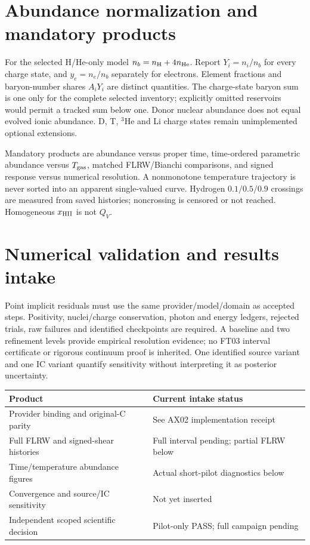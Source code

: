 \documentclass[11pt]{article}
\begin{document}
\section{Abundance normalization and mandatory products}
For the selected H/He-only model $n_b=n_{\rm H}+4n_{\rm He}$. Report $Y_i=n_i/n_b$ for every charge state, and $y_e=n_e/n_b$ separately for electrons. Element fractions and baryon-number shares $A_iY_i$ are distinct quantities. The charge-state baryon sum is one only for the complete selected inventory; explicitly omitted reservoirs would permit a tracked sum below one. Donor nuclear abundance does not equal evolved ionic abundance. D, T, $^3$He and Li charge states remain unimplemented optional extensions.

Mandatory products are abundance versus proper time, time-ordered parametric abundance versus $T_{\rm gas}$, matched FLRW/Bianchi comparisons, and signed response versus numerical resolution. A nonmonotone temperature trajectory is never sorted into an apparent single-valued curve. Hydrogen $0.1/0.5/0.9$ crossings are measured from saved histories; noncrossing is censored or not reached. Homogeneous $x_{\rm HII}$ is not $Q_V$.

\section{Numerical validation and results intake}
Point implicit residuals must use the same provider/model/domain as accepted steps. Positivity, nuclei/charge conservation, photon and energy ledgers, rejected trials, raw failures and identified checkpoints are required. A baseline and two refinement levels provide empirical resolution evidence; no FT03 interval certificate or rigorous continuum proof is inherited. One identified source variant and one IC variant quantify sensitivity without interpreting it as posterior uncertainty.

\begin{center}
\begin{tabular}{ll}\toprule
Product & Current intake status\\\midrule
Provider binding and original-C parity & See AX02 implementation receipt\\
Full FLRW and signed-shear histories & Full interval pending; partial FLRW below\\
Time/temperature abundance figures & Actual short-pilot diagnostics below\\
Convergence and source/IC sensitivity & Not yet inserted\\
Independent scoped scientific decision & Pilot-only PASS; full campaign pending\\\bottomrule
\end{tabular}
\end{center}
\end{document}
